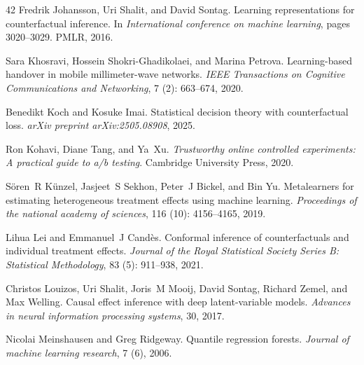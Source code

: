 \documentclass{article}
\theoremstyle{plain}
\theoremstyle{definition}
\theoremstyle{remark}
\begin{document}
\begin{thebibliography}{42}
Fredrik Johansson, Uri Shalit, and David Sontag.
\newblock Learning representations for counterfactual inference.
\newblock In \emph{International conference on machine learning}, pages 3020--3029. PMLR, 2016.

Sara Khosravi, Hossein Shokri-Ghadikolaei, and Marina Petrova.
\newblock Learning-based handover in mobile millimeter-wave networks.
\newblock \emph{IEEE Transactions on Cognitive Communications and Networking}, 7 (2): 663--674, 2020.

Benedikt Koch and Kosuke Imai.
\newblock Statistical decision theory with counterfactual loss.
\newblock \emph{arXiv preprint arXiv:2505.08908}, 2025.

Ron Kohavi, Diane Tang, and Ya~Xu.
\newblock \emph{Trustworthy online controlled experiments: A practical guide to a/b testing}.
\newblock Cambridge University Press, 2020.

S{\"o}ren~R K{\"u}nzel, Jasjeet~S Sekhon, Peter~J Bickel, and Bin Yu.
\newblock Metalearners for estimating heterogeneous treatment effects using machine learning.
\newblock \emph{Proceedings of the national academy of sciences}, 116 (10): 4156--4165, 2019.

Lihua Lei and Emmanuel~J Cand{\`e}s.
\newblock Conformal inference of counterfactuals and individual treatment effects.
\newblock \emph{Journal of the Royal Statistical Society Series B: Statistical Methodology}, 83 (5): 911--938, 2021.

Christos Louizos, Uri Shalit, Joris~M Mooij, David Sontag, Richard Zemel, and Max Welling.
\newblock Causal effect inference with deep latent-variable models.
\newblock \emph{Advances in neural information processing systems}, 30, 2017.

Nicolai Meinshausen and Greg Ridgeway.
\newblock Quantile regression forests.
\newblock \emph{Journal of machine learning research}, 7 (6), 2006.


\end{thebibliography}
\end{document}
